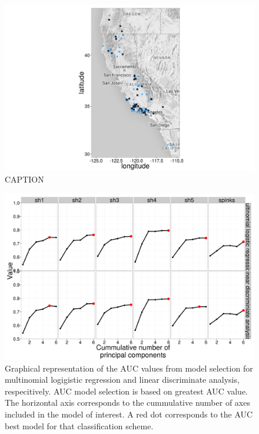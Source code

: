 \documentclass[12pt,letterpaper]{article}
\begin{document}
\begin{figure}[ht]
  \centering
  \includegraphics[height = \textheight, width = \textwidth, keepaspectratio = true]{figure/gap_map}
  \caption{CAPTION}
  \label{fig:gap_map}
\end{figure}

\begin{figure}[ht]
  \centering
  \includegraphics[height = \textheight, width = \textwidth, keepaspectratio = true]{figure/sel_val}
  \caption{Graphical representation of the AUC values from model selection for multinomial logigistic regression and linear discriminate analysis, respecitively. AUC model selection is based on greatest AUC value. The horizontal axis corresponds to the cummulative number of axes included in the model of interest. A red dot corresponds to the AUC best model for that classification scheme.}
  \label{fig:sel}
\end{figure}
\end{document}
